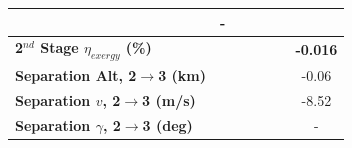 \begin{table}[ht]
\begin{tabular}{l c c c c c c}
	& -
	\\
	\hline 
	\textbf{2$^{nd}$ Stage $\eta_{exergy}$ (\%)}
	& \textbf{\secondExergyEffmSPARTANNinetyFive}
	& \textbf{\secondExergyEffmSPARTANNinetySevenFive}
	& \textbf{\secondExergyEffmSPARTANStandard}
	& \textbf{\secondExergyEffmSPARTANOneHundredTwoFive}
	& \textbf{\secondExergyEffmSPARTANOneHundredFive}
	& \textbf{-0.016}
	\\
	\textbf{Separation Alt, 2$\rightarrow$3 (km)}
	& \secondthirdSeparationAltmSPARTANNinetyFive
	& \secondthirdSeparationAltmSPARTANNinetySevenFive
	& \secondthirdSeparationAltmSPARTANStandard
	& \secondthirdSeparationAltmSPARTANOneHundredTwoFive
	& \secondthirdSeparationAltmSPARTANOneHundredFive
	&-0.06
	\\
	\textbf{Separation $v$, 2$\rightarrow$3 (m/s)}
	& \secondthirdSeparationvmSPARTANNinetyFive
	& \secondthirdSeparationvmSPARTANNinetySevenFive
	& \secondthirdSeparationvmSPARTANStandard
	& \secondthirdSeparationvmSPARTANOneHundredTwoFive
	& \secondthirdSeparationvmSPARTANOneHundredFive
	&-8.52
	\\
	\textbf{Separation $\gamma$, 2$\rightarrow$3 (deg)}
	& \secondthirdSeparationgammamSPARTANNinetyFive
	& \secondthirdSeparationgammamSPARTANNinetySevenFive
	& \secondthirdSeparationgammamSPARTANStandard
	& \secondthirdSeparationgammamSPARTANOneHundredTwoFive
	& \secondthirdSeparationgammamSPARTANOneHundredFive
	& -
	\\


\end{tabular}
\end{table}
